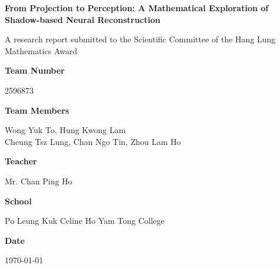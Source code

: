 \documentclass[12pt]{article}
\begin{document}
\begin{titlepage}
    \centering
    \vspace*{1cm}
    {\huge \textbf{From Projection to Perception: A Mathematical Exploration of Shadow-based Neural Reconstruction}\par}
    \vspace{1.5cm}
    {\normalsize
    A research report submitted to the Scientific Committee of the Hang Lung Mathematics Award\par}
    \vspace{1cm}
    {\normalsize \textbf{Team Number}\par 2596873\par}
    \vspace{0.5cm}
    {\normalsize \textbf{Team Members}\par Wong Yuk To, Hung Kwong Lam \\ Cheung Tsz Lung, Chan Ngo Tin, Zhou Lam Ho\par}
    \vspace{0.5cm}
    {\normalsize \textbf{Teacher}\par Mr. Chan Ping Ho\par}
    \vspace{0.5cm}
    {\normalsize \textbf{School}\par Po Leung Kuk Celine Ho Yam Tong College\par}
    \vspace{0.5cm}
    {\normalsize \textbf{Date}\par \today\par}
    \vspace{2cm}

\begin{abstract}
\raggedright %
This paper explores ShadowNeuS [LWX23], a neural network that reconstructs 3D geometry from single-view camera images using shadow and light cues. Unlike traditional 3D reconstruction methods relying on multi-view cameras or sensors, ShadowNeuS leverages a neural signed distance field (SDF) for accurate 3D geometry reconstruction. Analysis of the training process reveals deep connections to projective geometry, spatial reasoning in $\mathbb{R}^3$, and the network's perception of three-dimensional space.
\end{abstract}

\end{titlepage}
\tableofcontents

\newpage
\end{document}
